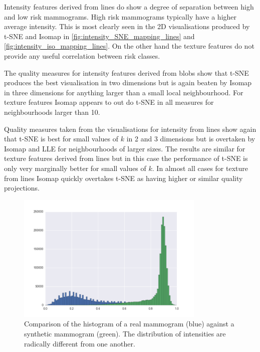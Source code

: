 Intensity features derived from lines do show a degree of separation between high and low risk mammograms. High risk mammograms typically have a higher average intensity. This is most clearly seen in the 2D visualisations produced by t-SNE and Isomap in \ref{fig:intensity_SNE_mapping_lines} and \ref{fig:intensity_iso_mapping_lines}. On the other hand the texture features do not provide any useful correlation between risk classes.

The quality measures for intensity features derived from blobs show that t-SNE produces the best visualisation in two dimensions but is again beaten by Isomap in three dimensions for anything larger than a small local neighbourhood. For texture features Isomap appears to out do t-SNE in all measures for neighbourhoods larger than 10.

Quality measures taken from the visualisations for intensity from lines show again that t-SNE is best for small values of $k$ in 2 and 3 dimensions but is overtaken by Isomap and LLE for neighbourhoods of larger sizes. The results are similar for texture features derived from lines but in this case the performance of t-SNE is only very marginally better for small values of $k$. In almost all cases for texture from lines Isomap quickly overtakes t-SNE as having higher or similar quality projections.


\begin{figure}[H]
	\label{fig:mammogram-histogram}
	\centering
	\includegraphics[width=0.8\textwidth]{Images/inverted_hist.png}	
	\caption{Comparison of the histogram of a real mammogram (blue) against a synthetic mammogram (green). The distribution of intensities are radically different from one another.}
\end{figure}

